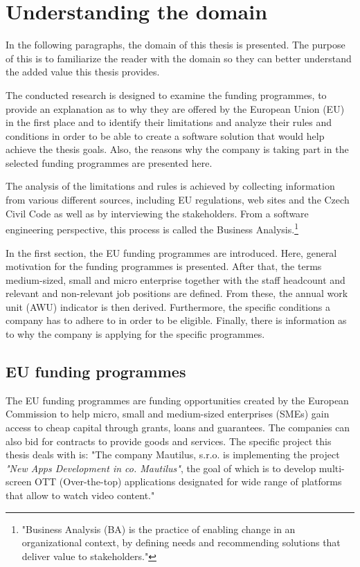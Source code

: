 \documentclass[12pt,oneside]{fithesis2}
\begin{document}
    \chapter{Understanding the domain}
    In the following paragraphs, the domain of this thesis is presented. The purpose of this is to familiarize the reader with the domain so they can better understand the added value this thesis provides.
    \par
    The conducted research is designed to examine the funding programmes, to provide an explanation as to why they are offered by the European Union (EU) in the first place and to identify their limitations and analyze their rules and conditions in order to be able to create a software solution that would help achieve the thesis goals. Also, the reasons why the company is taking part in the selected funding programmes are presented here.
    \par
    The analysis of the limitations and rules is achieved by collecting information from various different sources, including EU regulations, web sites and the Czech Civil Code as well as by interviewing the stakeholders. From a software engineering perspective, this process is called the Business Analysis.\footnote{"Business Analysis (BA) is the practice of enabling change in an organizational context, by defining needs and recommending solutions that deliver value to stakeholders."\cite{business-analysis}}
    \par
    In the first section, the EU funding programmes are introduced. Here, general motivation for the funding programmes is presented. After that, the terms medium-sized, small and micro enterprise together with the staff headcount and relevant and non-relevant job positions are defined. From these, the annual work unit (AWU) indicator is then derived. Furthermore, the specific conditions a company has to adhere to in order to be eligible. Finally, there is information as to why the company is applying for the specific programmes. 
    \section{EU funding programmes}
    The EU funding programmes are funding opportunities created by the European Commission to help micro, small and medium-sized enterprises (SMEs) gain access to cheap capital through grants, loans and guarantees. The companies can also bid for contracts to provide goods and services.
    The specific project this thesis deals with is: "The company Mautilus, s.r.o. is implementing the project \textit{"New Apps Development in co. Mautilus"}, the goal of which is to develop multi-screen OTT (Over-the-top) applications designated for wide range of platforms that allow to watch video content." \cite{mau-eu-subsidy}
\end{document}
